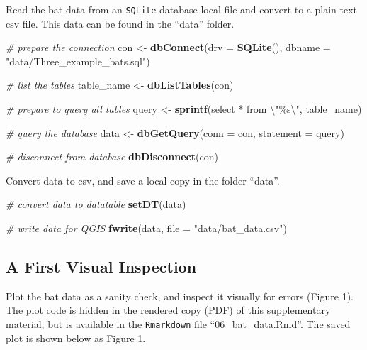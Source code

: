 \documentclass[
]{scrartcl}
\newenvironment{Shaded}{}{}
\newcommand{\CharTok}[1]{\textcolor[rgb]{0.25,0.44,0.63}{#1}}
\newcommand{\CommentTok}[1]{\textcolor[rgb]{0.38,0.63,0.69}{\textit{#1}}}
\newcommand{\DataTypeTok}[1]{\textcolor[rgb]{0.56,0.13,0.00}{#1}}
\newcommand{\KeywordTok}[1]{\textcolor[rgb]{0.00,0.44,0.13}{\textbf{#1}}}
\newcommand{\NormalTok}[1]{#1}
\newcommand{\StringTok}[1]{\textcolor[rgb]{0.25,0.44,0.63}{#1}}
\begin{document}
Read the bat data from an \texttt{SQLite} database local file and convert to a plain text csv file.
This data can be found in the ``data'' folder.

\begin{Shaded}
\begin{Highlighting}[]
\CommentTok{\# prepare the connection}
\NormalTok{con <{-}}\StringTok{ }\KeywordTok{dbConnect}\NormalTok{(}\DataTypeTok{drv =} \KeywordTok{SQLite}\NormalTok{(), }
                 \DataTypeTok{dbname =} \StringTok{"data/Three\_example\_bats.sql"}\NormalTok{)}

\CommentTok{\# list the tables}
\NormalTok{table\_name <{-}}\StringTok{ }\KeywordTok{dbListTables}\NormalTok{(con)}

\CommentTok{\# prepare to query all tables}
\NormalTok{query <{-}}\StringTok{ }\KeywordTok{sprintf}\NormalTok{(}\StringTok{\textquotesingle{}select * from }\CharTok{\textbackslash{}"}\StringTok{\%s}\CharTok{\textbackslash{}"}\StringTok{\textquotesingle{}}\NormalTok{, table\_name)}

\CommentTok{\# query the database}
\NormalTok{data <{-}}\StringTok{ }\KeywordTok{dbGetQuery}\NormalTok{(}\DataTypeTok{conn =}\NormalTok{ con, }\DataTypeTok{statement =}\NormalTok{ query)}

\CommentTok{\# disconnect from database}
\KeywordTok{dbDisconnect}\NormalTok{(con)}
\end{Highlighting}
\end{Shaded}

Convert data to csv, and save a local copy in the folder ``data''.

\begin{Shaded}
\begin{Highlighting}[]
\CommentTok{\# convert data to datatable}
\KeywordTok{setDT}\NormalTok{(data)}

\CommentTok{\# write data for QGIS}
\KeywordTok{fwrite}\NormalTok{(data, }\DataTypeTok{file =} \StringTok{"data/bat\_data.csv"}\NormalTok{)}
\end{Highlighting}
\end{Shaded}

\hypertarget{a-first-visual-inspection}{%
\subsection{A First Visual Inspection}\label{a-first-visual-inspection}}

Plot the bat data as a sanity check, and inspect it visually for errors (Figure 1).
The plot code is hidden in the rendered copy (PDF) of this supplementary material, but is available in the \texttt{Rmarkdown} file ``06\_bat\_data.Rmd''.
The saved plot is shown below as Figure 1.
\end{document}

